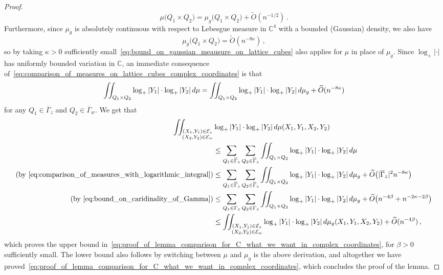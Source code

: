 \documentclass[10pt,a4paper]{amsart}
\def\Ga{{\Gamma}}
\newcommand{\bC}{\mathbb C}
\newcommand{\cE}{\mathcal{E}}
\begin{document}
\begin{proof}
        \begin{equation}
        \label{eq:comparison_of_measures_on_lattice_cubes_complex_coordinates}
            \mu\big(Q_1\times Q_2\big) = \mu_g\big(Q_1\times Q_2\big) + \widetilde{O}(n^{-1/2}) \, .
        \end{equation}
        Furthermore, since $\mu_g$ is absolutely continuous with respect to Lebesgue measure in $\bC^4$ with a bounded (Gaussian) density, we also have
        \begin{equation}
        \label{eq:bound_on_gaussian_meausure_on_lattice_cubes}
           \mu_g\big(Q_1\times Q_2\big) = \widetilde{O}(n^{-8\kappa}) \, , 
        \end{equation}
        so by taking $\kappa>0$ sufficiently small~\eqref{eq:bound_on_gaussian_meausure_on_lattice_cubes} also applies for $\mu$ in place of $\mu_g$. Since $\log_+|\cdot|$ has uniformly bounded variation in $\bC$, an immediate consequence of~\eqref{eq:comparison_of_measures_on_lattice_cubes_complex_coordinates} is that 
        \begin{equation}
        \label{eq:comparison_of_measures_with_logarithmic_integral}
            \iint_{Q_1\times Q_2} \log_+|Y_1| \cdot \log_+|Y_2| \, {\rm d}\mu \\ = \iint_{Q_1\times Q_2} \log_+|Y_1| \cdot \log_+|Y_2| \, {\rm d}\mu_g + \widetilde{O}(n^{-8\kappa})
        \end{equation}
        for any $Q_1\in \overline{\Ga}_z$ and $Q_2\in \overline{\Ga}_w$. We get that
        \begin{align*}
            \iint_{\substack{  (X_1,Y_1)\in \cE_z \\  (X_2,Y_2)\in \cE_w }} & \log_+|Y_1| \cdot \log_+|Y_2| \, {\rm d}\mu(X_1,Y_1,X_2,Y_2) \\ & \le \sum_{Q_1\in \overline{\Ga}_z} \sum_{Q_2\in \overline{\Ga}_z} \iint_{Q_1\times Q_2} \log_+|Y_1| \cdot \log_+|Y_2| \, {\rm d}\mu \\ (\text{by}~\eqref{eq:comparison_of_measures_with_logarithmic_integral}) &\le \sum_{Q_1\in \overline{\Ga}_z} \sum_{Q_2\in \overline{\Ga}_z} \iint_{Q_1\times Q_2} \log_+|Y_1| \cdot \log_+|Y_2| \, {\rm d}\mu_g + \widetilde{O}\big(|\overline{\Ga}_z|^2 n^{-8\kappa}\big) 
            \\ (\text{by}~\eqref{eq:bound_on_caridinality_of_Gamma}) & \le \sum_{Q_1\in \Ga_z} \sum_{Q_2\in \Ga_z} \iint_{Q_1\times Q_2} \log_+|Y_1| \cdot \log_+|Y_2| \, {\rm d}\mu_g + \widetilde{O}\big(n^{-4\beta} + n^{-2\kappa -2\beta} \big) 
            \\ & \le 
            \iint_{\substack{  (X_1,Y_1)\in \cE_z \\  (X_2,Y_2)\in \cE_w }} \log_+|Y_1| \cdot \log_+|Y_2| \, {\rm d}\mu_g(X_1,Y_1,X_2,Y_2)  + \widetilde{O}(n^{-4\beta}) \, , 
        \end{align*}
        which proves the upper bound in~\eqref{eq:proof_of_lemma_comparison_for_C_what_we_want_in_complex_coordinates}, for $\beta>0$ sufficiently small. The lower bound also follows by switching between $\mu$ and $\mu_g$ is the above derivation, and altogether we have proved~\eqref{eq:proof_of_lemma_comparison_for_C_what_we_want_in_complex_coordinates}, which concludes the proof of the lemma.
    \end{proof}
\end{document}
